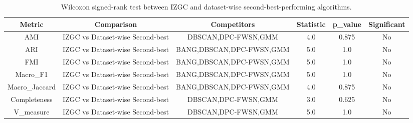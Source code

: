 
\begin{table}[ht]
\centering
\caption{
Wilcoxon signed-rank test between IZGC and dataset-wise second-best-performing algorithms.
}
\label{
tab:S3_wilcoxon
}

\begin{tabular}{cccccc}
\toprule
Metric & Comparison & Competitors & Statistic & p_value & Significant\\

\midrule
AMI & IZGC vs Dataset-wise Second-best & DBSCAN,DPC-FWSN,GMM & 4.0 & 0.875 & No\\
ARI & IZGC vs Dataset-wise Second-best & BANG,DBSCAN,DPC-FWSN,GMM & 5.0 & 1.0 & No\\
FMI & IZGC vs Dataset-wise Second-best & BANG,DBSCAN,DPC-FWSN,GMM & 5.0 & 1.0 & No\\
Macro_F1 & IZGC vs Dataset-wise Second-best & BANG,DBSCAN,DPC-FWSN,GMM & 5.0 & 1.0 & No\\
Macro_Jaccard & IZGC vs Dataset-wise Second-best & BANG,DBSCAN,DPC-FWSN,GMM & 4.0 & 0.875 & No\\
Completeness & IZGC vs Dataset-wise Second-best & DBSCAN,DPC-FWSN,GMM & 3.0 & 0.625 & No\\
V_measure & IZGC vs Dataset-wise Second-best & DBSCAN,DPC-FWSN,GMM & 5.0 & 1.0 & No\\

\bottomrule
\end{tabular}
\end{table}
